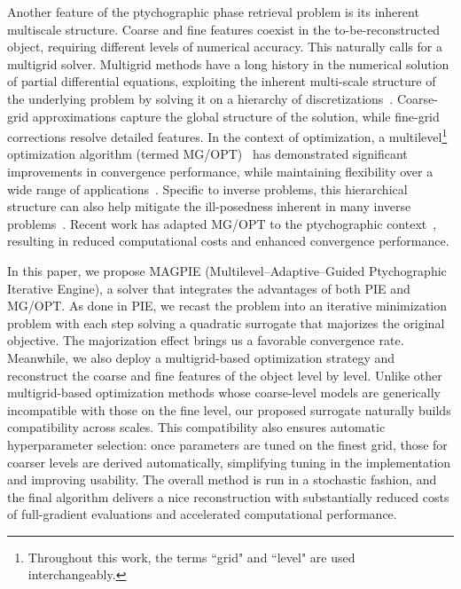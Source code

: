 \documentclass{article}
\numberwithin{equation}{section}
\begin{document}
Another feature of the ptychographic phase retrieval problem is its inherent multiscale structure. Coarse and fine features coexist in the to-be-reconstructed object, requiring different levels of numerical accuracy. This naturally calls for a multigrid solver. Multigrid methods have a long history in the numerical solution of partial differential equations, exploiting the inherent multi-scale structure of the underlying problem by solving it on a hierarchy of discretizations~\cite{multigrid_book}. Coarse-grid approximations capture the global structure of the solution, while fine-grid corrections resolve detailed features. In the context of optimization, a multilevel\footnote{Throughout this work, the terms ``grid" and ``level" are used interchangeably.} optimization algorithm (termed MG/OPT)~\cite{MGOPT} has demonstrated significant improvements in convergence performance, while maintaining flexibility over a wide range of applications~\cite{Nash01012000, mgopt_1}. Specific to inverse problems, this hierarchical structure can also help mitigate the ill-posedness inherent in many inverse problems~\cite{mginverse1}. Recent work has adapted MG/OPT to the ptychographic context~\cite{MGOPT_ptycho}, resulting in reduced computational costs and enhanced convergence performance.


In this paper, we propose MAGPIE (Multilevel--Adaptive--Guided Ptychographic Iterative Engine), a solver that integrates the advantages of both PIE and MG/OPT. As done in PIE, we recast the problem into an iterative minimization problem with each step solving a quadratic surrogate that majorizes the original objective. The majorization effect brings us a favorable convergence rate. Meanwhile, we also deploy a multigrid-based optimization strategy and reconstruct the coarse and fine features of the object level by level. Unlike other multigrid-based optimization methods whose coarse-level models are generically incompatible with those on the fine level, our proposed surrogate naturally builds compatibility across scales. This compatibility also ensures automatic hyperparameter selection: once parameters are tuned on the finest grid, those for coarser levels are derived automatically, simplifying tuning in the implementation and improving usability. The overall method is run in a stochastic fashion, and the final algorithm delivers a nice reconstruction with substantially reduced costs of full-gradient evaluations and accelerated computational performance.
\end{document}
